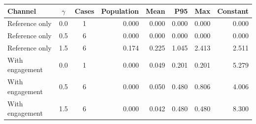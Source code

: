 \begin{tabular}{@{}lccrrrrr@{}}
\toprule
Channel & \(\gamma\) & Cases & Population & Mean & P95 & Max & Constant \\
\midrule
Reference only & 0.0 & 1 & 0.000 & 0.000 & 0.000 & 0.000 & 0.000 \\
Reference only & 0.5 & 6 & 0.000 & 0.000 & 0.000 & 0.000 & 0.000 \\
Reference only & 1.5 & 6 & 0.174 & 0.225 & 1.045 & 2.413 & 2.511 \\
With engagement & 0.0 & 1 & 0.000 & 0.049 & 0.201 & 0.201 & 5.279 \\
With engagement & 0.5 & 6 & 0.000 & 0.050 & 0.480 & 0.806 & 4.006 \\
With engagement & 1.5 & 6 & 0.000 & 0.042 & 0.480 & 0.480 & 8.300 \\
\bottomrule
\end{tabular}
